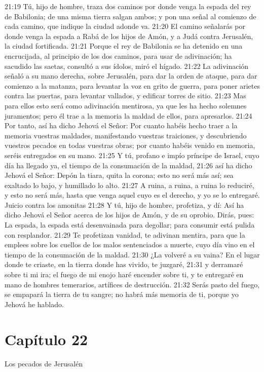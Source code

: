 21:19 Tú, hijo de hombre, traza dos caminos por donde venga la espada del rey de Babilonia; de una misma tierra salgan ambos; y pon una señal al comienzo de cada camino, que indique la ciudad adonde va.   
21:20 El camino señalarás por donde venga la espada a Rabá de los hijos de Amón, y a Judá contra Jerusalén, la ciudad fortificada.   
21:21 Porque el rey de Babilonia se ha detenido en una encrucijada, al principio de los dos caminos, para usar de adivinación; ha sacudido las saetas, consultó a sus ídolos, miró el hígado.   
21:22 La adivinación señaló a su mano derecha, sobre Jerusalén, para dar la orden de ataque, para dar comienzo a la matanza, para levantar la voz en grito de guerra, para poner arietes contra las puertas, para levantar vallados, y edificar torres de sitio.   
21:23 Mas para ellos esto será como adivinación mentirosa, ya que les ha hecho solemnes juramentos; pero él trae a la memoria la maldad de ellos, para apresarlos.   
21:24 Por tanto, así ha dicho Jehová el Señor: Por cuanto habéis hecho traer a la memoria vuestras maldades, manifestando vuestras traiciones, y descubriendo vuestros pecados en todas vuestras obras; por cuanto habéis venido en memoria, seréis entregados en su mano.   
21:25 Y tú, profano e impío príncipe de Israel, cuyo día ha llegado ya, el tiempo de la consumación de la maldad,   
21:26 así ha dicho Jehová el Señor: Depón la tiara, quita la corona; esto no será más así; sea exaltado lo bajo, y humillado lo alto.   
21:27 A ruina, a ruina, a ruina lo reduciré, y esto no será más, hasta que venga aquel cuyo es el derecho, y yo se lo entregaré.   
Juicio contra los amonitas   
21:28 Y tú, hijo de hombre, profetiza, y dí: Así ha dicho Jehová el Señor acerca de los hijos de Amón,  y de su oprobio. Dirás, pues: La espada, la espada está desenvainada para degollar; para consumir está pulida con resplandor.   
21:29 Te profetizan vanidad, te adivinan mentira, para que la emplees sobre los cuellos de los malos sentenciados a muerte, cuyo día vino en el tiempo de la consumación de la maldad.   
21:30 ¿La volveré a su vaina? En el lugar donde te criaste, en la tierra donde has vivido, te juzgaré,   
21:31 y derramaré sobre ti mi ira; el fuego de mi enojo haré encender sobre ti, y te entregaré en mano de hombres temerarios, artífices de destrucción.   
21:32 Serás pasto del fuego, se empapará la tierra de tu sangre; no habrá más memoria de ti, porque yo Jehová he hablado.   
\section*{Capítulo 22 } 
Los pecados de Jerusalén   
  
